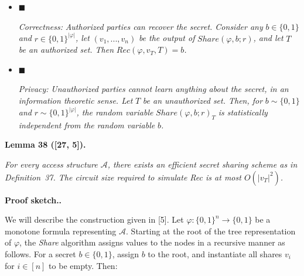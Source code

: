 \begin{itemize}


\item[] 
$\blacksquare$ 


\emph{Correctness: }\emph{Authorized parties can recover the secret. Consider any }$b\in\{0,1\}$\emph{ and }$r\in\{0,1\}^{|\varphi|}$\emph{, let }$(v_{1},...,v_{n})$\emph{ be the output of }$Share(\varphi,b;r)$\emph{, and let }$T$\emph{ be an authorized set. Then }$Rec(\varphi,v_{T},T)=b$\emph{.}\par





\item[] 
$\blacksquare$ 


\emph{Privacy: }\emph{Unauthorized parties cannot learn anything about the secret, in an information theoretic sense. Let }$T$\emph{ be an unauthorized set. Then, for }$b\sim\{0,1\}$\emph{ and }$r\sim\{0,1\}^{|\varphi|}$\emph{, the random variable }$Share(\varphi,b;r)_{T}$\emph{ is statistically independent from the random variable }$b$\emph{.}\par





\end{itemize}







\par\medskip\noindent\textbf{
\textbf{Lemma 38}\textbf{ }([27, 5])\textbf{.}
}\par



\emph{For every access structure $\mathcal{A}$, there exists an efficient secret sharing scheme as in Definition 37. The circuit size required to simulate Rec is at most $O(|v_{T}|^{2})$.}\par






\par\medskip\noindent\textbf{Proof sketch..}\par




We will describe the construction given in [5]. Let $\varphi:\{0,1\}^{n}\to\{0,1\}$ be a monotone formula representing $\mathcal{A}$. Starting at the root of the tree representation of $\varphi$, the \emph{Share} algorithm assigns values to the nodes in a recursive manner as follows. For a secret $b\in\{0,1\}$, assign $b$ to the root, and instantiate all shares $v_{i}$ for $i\in[n]$ to be empty. Then:\par


